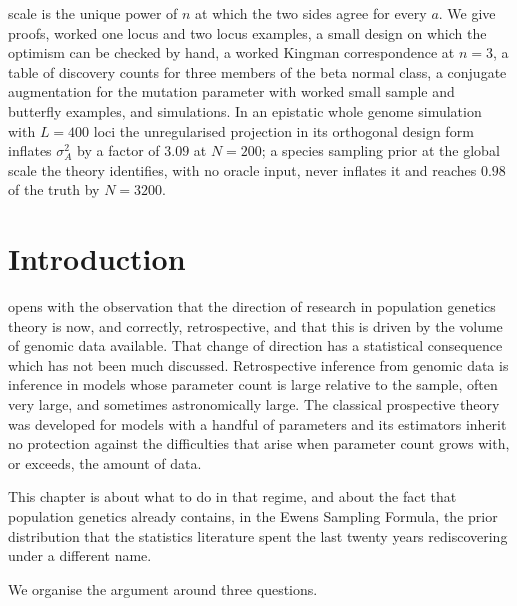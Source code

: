 \begin{chaptersummary}
scale is the unique power of $n$ at which the two sides agree for every $a$. We give proofs, worked one locus and two locus examples, a
small design on which the optimism can be checked by hand, a worked Kingman
correspondence at $n=3$, a table of discovery counts for three members of the beta normal
class, a conjugate augmentation for the mutation parameter with worked small sample and
butterfly examples, and simulations. In an epistatic
whole genome simulation with $L=400$ loci the unregularised projection in its orthogonal design form inflates
$\sigma_A^2$ by a factor of $3.09$ at $N=200$; a species sampling prior at the global scale the
theory identifies, with no oracle input, never inflates it and reaches $0.98$ of the truth by
$N=3200$.
\end{chaptersummary}
\section{Introduction}

\citet{mp:ewens2024} opens with the observation that the direction of research in population
genetics theory is now, and correctly, retrospective, and that this is driven by the volume
of genomic data available. That change of direction has a statistical consequence which has
not been much discussed. Retrospective inference from genomic data is inference in models
whose parameter count is large relative to the sample, often very large, and sometimes
astronomically large. The classical prospective theory was developed for models with a
handful of parameters and its estimators inherit no protection against the difficulties that
arise when parameter count grows with, or exceeds, the amount of data.

This chapter is about what to do in that regime, and about the fact that population genetics
already contains, in the Ewens Sampling Formula, the prior distribution that the statistics
literature spent the last twenty years rediscovering under a different name.

We organise the argument around three questions.

